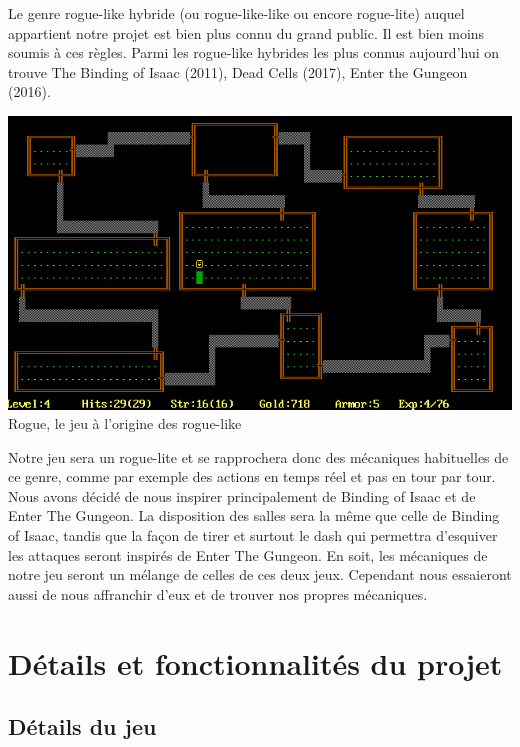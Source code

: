 \documentclass[]{extarticle}
\begin{document}
\bigbreak
Le genre rogue-like hybride (ou rogue-like-like ou encore rogue-lite) auquel appartient notre projet est bien plus connu du grand public. Il est bien moins soumis à ces règles. Parmi les rogue-like hybrides les plus connus aujourd’hui on trouve The Binding of Isaac (2011), Dead Cells (2017), Enter the Gungeon (2016).
\bigbreak
\bigbreak
\bigbreak
\bigbreak
\begin{center}
\includegraphics[scale=0.5]{Rogue.png} \\
Rogue, le jeu à l'origine des rogue-like
\end{center}

\bigbreak
\bigbreak
\bigbreak
Notre jeu sera un rogue-lite et se rapprochera donc des mécaniques habituelles de ce genre, comme par exemple des actions en temps réel et pas en tour par tour. Nous avons décidé de nous inspirer principalement de Binding of Isaac et de Enter The Gungeon. La disposition des salles sera la même que celle de Binding of Isaac, tandis que la façon de tirer et surtout le dash qui permettra d'esquiver les attaques seront inspirés de Enter The Gungeon. En soit, les mécaniques de notre jeu seront un mélange de celles de ces deux jeux. Cependant nous essaieront aussi de nous affranchir d'eux et de trouver nos propres mécaniques.

\newpage
\section{Détails et fonctionnalités du projet}

	\subsection{Détails du jeu}
	
\end{document}
